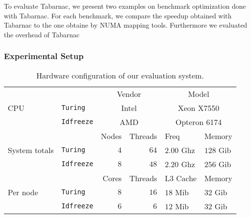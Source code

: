 
To evaluate \gls{Tabarnac}, we present two examples on benchmark optimization done with \gls{Tabarnac}.
For each benchmark, we compare the speedup obtained with \gls{Tabarnac} to the one obtaine by \gls{NUMA} mapping tools.
Furthermore we evaluated the overhead of \gls{Tabarnac}

\subsubsection{Experimental Setup}


\begin{table}[htb]
    \centering
    \begin{tabular}{lp{1.1cm}rrp{1.35cm}p{1.1cm}}
        \toprule
        \multirow{3}{.8cm}{CPU}
        &  & \multicolumn{2}{c}{Vendor} & \multicolumn{2}{c}{Model} \\
        \cmidrule(lr){3-6}
        & \texttt{Turing}  & \multicolumn{2}{c}{Intel} & \multicolumn{2}{c}{Xeon X7550} \\
        & \texttt{Idfreeze} & \multicolumn{2}{c}{AMD} & \multicolumn{2}{c}{Opteron 6174} \\
        \midrule
        \midrule
        \multirow{3}{.8cm}{System totals}
        & & Nodes & Threads & Freq & Memory \\
        \cmidrule(lr){3-6}
        & \texttt{Turing}   & $4$ & $64$ & $2.00$ Ghz & $128$ Gib \\
        & \texttt{Idfreeze} & $8$ & $48$ & $2.20$ Ghz & $256$ Gib\\
        \midrule
        \midrule
        \multirow{3}{.8cm}{Per node}
        & & Cores & Threads & L3 Cache & Memory \\
        \cmidrule(lr){3-6}
        & \texttt{Turing}   & $8$ & $16$ & $18$ Mib & $32$ Gib \\
        & \texttt{Idfreeze} & $6$ & $6$  & $12$ Mib & $32$ Gib \\
        \bottomrule
    \end{tabular}
    \caption{Hardware configuration of our evaluation system.}
    \label{tab:hw}
\end{table}

